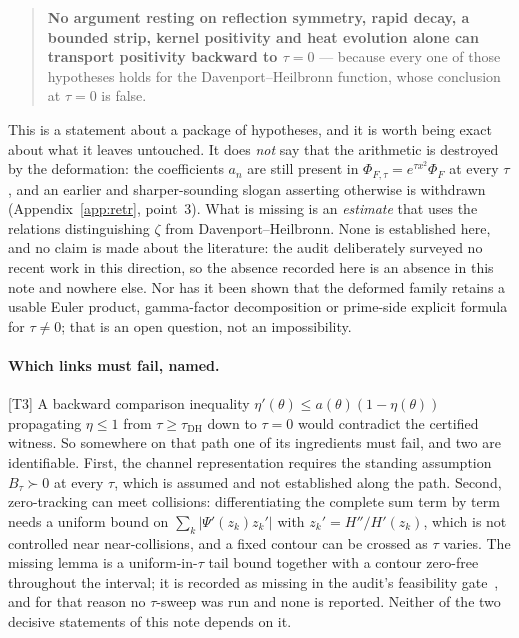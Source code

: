 \documentclass[11pt,a4paper]{article}
\theoremstyle{remark}
\newcommand{\tier}[1]{{\small\textsf{[#1]}}}
\newcommand{\PhiF}{\Phi_F}
\begin{document}
\begin{quote}
\textbf{No argument resting on reflection symmetry, rapid decay, a bounded strip, kernel
positivity and heat evolution alone can transport positivity backward to $\tau=0$} ---
because every one of those hypotheses holds for the Davenport--Heilbronn function, whose
conclusion at $\tau=0$ is false.
\end{quote}

This is a statement about a package of hypotheses, and it is worth being exact about what it
leaves untouched. It does \emph{not} say that the arithmetic is destroyed by the
deformation: the coefficients $a_n$ are still present in
$\Phi_{F,\tau}=e^{\tau x^2}\PhiF$ at every $\tau$, and an earlier and sharper-sounding
slogan asserting otherwise is withdrawn (Appendix~\ref{app:retr}, point~3). What is missing
is an \emph{estimate} that uses the relations distinguishing $\zeta$ from
Davenport--Heilbronn. None is established here, and no claim is made about the
literature: the audit deliberately surveyed no recent work in this direction, so the
absence recorded here is an absence in this note and nowhere else. Nor has it been shown that the deformed family retains a usable Euler
product, gamma-factor decomposition or prime-side explicit formula for $\tau\ne0$; that is
an open question, not an impossibility.

\paragraph{Which links must fail, named.} \tier{T3} A backward comparison inequality
$\eta'(\theta)\le a(\theta)(1-\eta(\theta))$ propagating $\eta\le1$ from $\tau\ge\tau_{\mathrm{DH}}$
down to $\tau=0$ would contradict the certified witness. So somewhere on that path one of
its ingredients must fail, and two are identifiable. First, the channel representation
requires the standing assumption $B_\tau\succ0$ at every $\tau$, which is assumed and not
established along the path. Second, zero-tracking can meet collisions: differentiating the
complete sum term by term needs a uniform bound on $\sum_k|\Psi'(z_k)z_k'|$ with
$z_k'=H''/H'(z_k)$, which is not controlled near near-collisions, and a fixed contour can be
crossed as $\tau$ varies. The missing lemma is a uniform-in-$\tau$ tail bound together with
a contour zero-free throughout the interval; it is recorded as missing in the audit's
feasibility gate~\cite[\S3]{audit}, and for that reason no $\tau$-sweep was run and none is
reported. Neither of the two decisive statements of this note depends on it.
\end{document}
